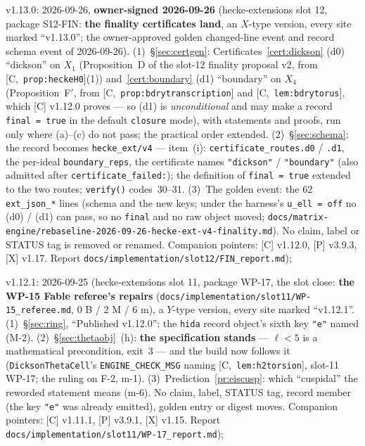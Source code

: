 \documentclass[11pt]{article}
\theoremstyle{remark}
\newcommand{\HA}[1]{[C,~\texttt{#1}]}      %
\begin{document}
v1.13.0: 2026-09-26, \textbf{owner-signed 2026-09-26} (hecke-extensions slot 12,
package S12-FIN: \textbf{the finality certificates land}, an $X$-type version, every site marked
``v1.13.0''; the owner-approved golden changed-line event and record schema event of 2026-09-26).
(1)~\S\ref{sec:certgen}: Certificates~\ref{cert:dickson} (d0) ``dickson'' on $X_1$ (Proposition~D of the
slot-12 finality proposal v2, from \HA{prop:heckeH0}(1)) and~\ref{cert:boundary} (d1) ``boundary'' on $X_4$
(Proposition~F$'$, from \HA{prop:bdrytranscription} and \HA{lem:bdrytorus}, which [C] v1.12.0 proves ---
so (d1) is \emph{unconditional} and may make a record \texttt{final = true} in the default
\texttt{closure} mode), with statements and proofs, run only where (a)--(c) do not pass; the practical
order extended. (2)~\S\ref{sec:schema}: the record becomes \texttt{hecke\_ext/v4} --- item~(i):
\texttt{certificate\_routes.d0} / \texttt{.d1}, the per-ideal \texttt{boundary\_reps}, the certificate names
\texttt{"dickson"} / \texttt{"boundary"} (also admitted after \texttt{certificate\_failed:}); the definition
of \texttt{final = true} extended to the two routes; \texttt{verify()} codes~30--31. (3)~The golden event:
the $62$ \texttt{ext\_json\_*} lines (schema and the new keys; under the harness's \texttt{u\_ell = off}
no (d0) / (d1) can pass, so no \texttt{final} and no raw object moved;
\texttt{docs/matrix-engine/rebaseline-2026-09-26-hecke-ext-v4-finality.md}). No claim, label or STATUS tag
is removed or renamed. Companion pointers: [C] v1.12.0, [P] v3.9.3, [X] v1.17. Report
\texttt{docs/implementation/slot12/FIN\_report.md});

v1.12.1: 2026-09-25 (hecke-extensions slot 11, package WP-17, the slot close: \textbf{the
WP-15 Fable referee's repairs} (\texttt{docs/implementation/slot11/WP-15\_referee.md}, 0 B / 2 M / 6 m), a
$Y$-type version, every site marked ``v1.12.1''. (1)~\S\ref{sec:ring}, ``Published v1.12.0'': the
\texttt{hida} record object's sixth key \texttt{"e"} named (M-2). (2)~\S\ref{sec:thetaobj}~(h): \textbf{the
specification stands} --- $\ell<5$ is a mathematical precondition, exit~$3$ --- and the build now follows it
(\texttt{DicksonThetaCell}'s \texttt{ENGINE\_CHECK\_MSG} naming \HA{lem:h2torsion}, slot-11 WP-17; the ruling
on F-2, m-1). (3)~Prediction~\ref{pr:eiscusp}: which ``cuspidal'' the reworded statement means (m-6). No
claim, label, STATUS tag, record member (the key \texttt{"e"} was already emitted), golden entry or digest
moves. Companion pointers: [C] v1.11.1, [P] v3.9.1, [X] v1.15. Report
\texttt{docs/implementation/slot11/WP-17\_report.md});
\end{document}
